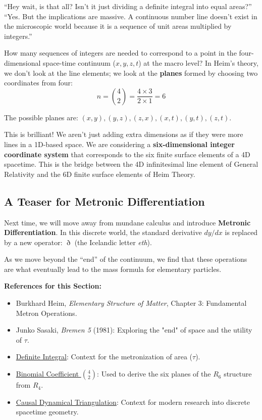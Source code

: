 \documentclass[11pt,a4paper,oneside]{article}
\newenvironment{sectionrefs}
  {\par\vspace{1em}\noindent\textbf{\textsf{References for this Section:}}\begin{itemize}[leftmargin=*, label={\scriptsize$\blacksquare$}, itemsep=2pt]}
  {\end{itemize}}
\begin{document}
\begin{reflectionbox}[title={Notes and Reflections: From 4D Lines to 6D Planes}]
``Hey wait, is that all? Isn't it just dividing a definite integral into equal areas?''\\
``Yes. But the implications are massive. A continuous number line doesn't exist in the microscopic world because it is a sequence of unit areas multiplied by integers.''

How many sequences of integers are needed to correspond to a point in the four-dimensional space-time continuum ($x, y, z, t$) at the macro level? In Heim's theory, we don't look at the line elements; we look at the \textbf{planes} formed by choosing two coordinates from four:
\begin{equation}
    n = \binom{4}{2} = \frac{4 \times 3}{2 \times 1} = 6
\end{equation}

The possible planes are: $(x,y), (y,z), (z,x), (x,t), (y,t), (z,t)$.

This is brilliant! We aren't just adding extra dimensions as if they were more lines in a 1D-based space. We are considering a \textbf{six-dimensional integer coordinate system} that corresponds to the six finite surface elements of a 4D spacetime. This is the bridge between the 4D infinitesimal line element of General Relativity and the 6D finite surface elements of Heim Theory.
\end{reflectionbox}

\subsection{A Teaser for Metronic Differentiation}

Next time, we will move away from mundane calculus and introduce \textbf{Metronic Differentiation}. In this discrete world, the standard derivative $dy/dx$ is replaced by a new operator: $\eth$ (the Icelandic letter \textit{eth}).

As we move beyond the ``end'' of the continuum, we find that these operations are what eventually lead to the mass formula for elementary particles.

\begin{sectionrefs}
    \item Burkhard Heim, \textit{Elementary Structure of Matter}, Chapter 3: Fundamental Metron Operations.
    \item Junko Sasaki, \textit{Bremen 5} (1981): Exploring the "end" of space and the utility of $\tau$.
    \item \href{https://en.wikipedia.org/wiki/Definite_integral}{Definite Integral}: Context for the metronization of area ($\tau$).
    \item \href{https://en.wikipedia.org/wiki/Binomial_coefficient}{Binomial Coefficient $\binom{4}{2}$}: Used to derive the six planes of the $R_6$ structure from $R_4$.
    \item \href{https://en.wikipedia.org/wiki/Causal_dynamical_triangulation}{Causal Dynamical Triangulation}: Context for modern research into discrete spacetime geometry.
\end{sectionrefs}
\end{document}
